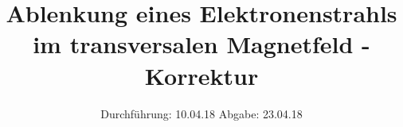 

\subject{V502}
\title{Ablenkung eines Elektronenstrahls im transversalen Magnetfeld - Korrektur}
\date{%
  Durchführung: 10.04.18
  \hspace{3em}
  Abgabe: 23.04.18
}



\maketitle
\thispagestyle{empty}
\tableofcontents
\newpage






\printbibliography{}


